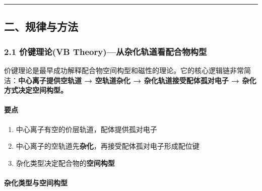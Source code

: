 \begin{center}\rule{0.5\linewidth}{0.5pt}\end{center}

\subsection{二、规律与方法}\label{ux4e8cux89c4ux5f8bux4e0eux65b9ux6cd5}

\subsubsection{2.1 价键理论(VB Theory)---从杂化轨道看配合物构型}\label{ux4ef7ux952eux7406ux8bbavb-theoryux4eceux6742ux5316ux8f68ux9053ux770bux914dux5408ux7269ux6784ux578b}

价键理论是最早成功解释配合物空间构型和磁性的理论。它的核心逻辑链非常简洁：\textbf{中心离子提供空轨道 → 空轨道杂化 → 杂化轨道接受配体孤对电子 → 杂化方式决定空间构型。}

\paragraph{要点}\label{ux8981ux70b9}

\begin{enumerate}
\def\labelenumi{\arabic{enumi}.}
\tightlist
\item
  中心离子有空的价层轨道，配体提供孤对电子
\item
  中心离子的空轨道先\textbf{杂化}，再接受配体孤对电子形成配位键
\item
  杂化类型决定配合物的\textbf{空间构型}
\end{enumerate}

\paragraph{杂化类型与空间构型}\label{ux6742ux5316ux7c7bux578bux4e0eux7a7aux95f4ux6784ux578b}

